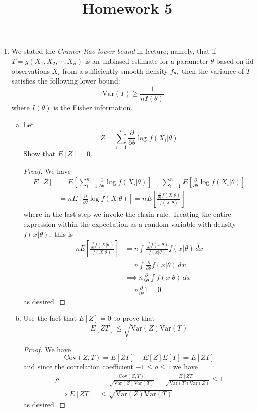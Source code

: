 \documentclass{article}
\newcommand{\var}{\mathrm{Var}}
\newcommand{\cov}{\mathrm{Cov}}
\begin{document}
\title{Homework 5}
\maketitle
\thispagestyle{fancy}

\begin{enumerate}
	\item We stated the \textit{Cramer-Rao lower bound} in lecture; namely, that if $T=g(X_1, X_2, \cdots, X_n)$ is an unbiased estimate for a parameter $\theta$ based on iid observations $X_i$ from a sufficiently smooth density $f_\theta,$ then the variance of $T$ satisfies the following lower bound: \[\var(T)\ge\frac{1}{nI(\theta)}\] where $I(\theta)$ is the Fisher information. 

		\begin{enumerate}[(a)]
			\item Let \[Z=\sum_{i=1}^{n}\frac{\partial}{\partial\theta}\log f(X_i|\theta)\] Show that $E[Z]=0.$
				\begin{proof}
					We have 
					\begin{align*}
						E[Z] &= E\left[ \sum_{i=1}^{n} \frac{\partial}{\partial\theta}\log f(X_i|\theta) \right] = \sum_{i=1}^{n} E\left[ \frac{\partial}{\partial\theta}\log f(X_i|\theta) \right] \\
						&=nE\left[ \frac{\partial}{\partial\theta}\log f(X|\theta) \right] = nE\left[ \frac{\frac{\partial}{\partial\theta}f(X|\theta)}{f(X|\theta)} \right]
					\end{align*} where in the last step we invoke the chain rule. Treating the entire expression within the expectation as a random variable with density $f(x|\theta),$ this is
					\begin{align*}
						nE\left[  \frac{\frac{\partial}{\partial\theta}f(X|\theta)}{f(X|\theta)}\right] &= n\int \frac{\frac{\partial}{\partial\theta}f(x|\theta)}{f(x|\theta)}f(x|\theta)\, dx \\
						&= n\int \frac{\partial}{\partial\theta} f(x|\theta)\, dx \\
						&\implies n\frac{\partial}{\partial\theta}\int f(x|\theta)\, dx \\
						&= n\frac{\partial}{\partial\theta}1 = 0
					\end{align*} as desired.
					
				\end{proof}

				\newpage
			\item Use the fact that $E[Z]=0$ to prove that \[E[ZT]\le\sqrt{\var(Z)\var(T)}\]
				\begin{proof}
					We have \[\cov(Z, T)=E[ZT]-E[Z]E[T]=E[ZT]\] and since the correlation coefficient $-1\le\rho\le1$ we have 
					\begin{align*}
						\rho &= \frac{\cov(Z, T)}{\sqrt{\var(Z)\var(T)}}=\frac{E[ZT]}{\sqrt{\var(T)\var(Z)}}\le 1 \\
						\implies E[ZT]&\le\sqrt{\var(Z)\var(T)}
					\end{align*} as desired.
					

\end{proof}
\end{enumerate}
\end{enumerate}
\end{document}
